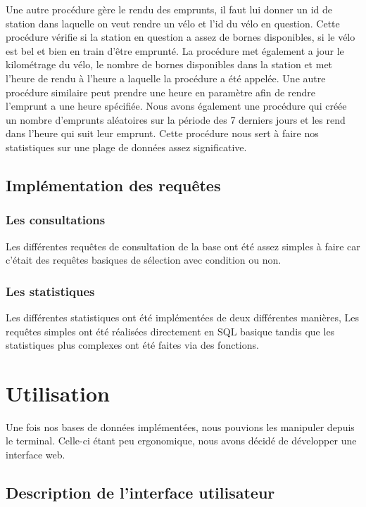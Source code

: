 \documentclass[10pt]{article}
\begin{document}
  Une autre procédure gère le rendu des emprunts, il faut lui donner un id de station dans laquelle on veut rendre un vélo et l'id du vélo en question. Cette procédure vérifie si la station en question a assez de bornes disponibles, si le vélo est bel et bien en train d'être emprunté. La procédure met également a jour le kilométrage du vélo, le nombre de bornes disponibles dans la station et met l'heure de rendu à l'heure a laquelle la procédure a été appelée. Une autre procédure similaire peut prendre une heure en paramètre afin de rendre l'emprunt a une heure spécifiée. 
  Nous avons également une procédure qui créée un nombre d'emprunts aléatoires sur la période des 7 derniers jours et les rend dans l'heure qui suit leur emprunt. Cette procédure nous sert à faire nos statistiques sur une plage de données assez significative.
  
  \subsection{Implémentation des requêtes}\label{subsec:requete}
  \subsubsection{Les consultations}
  Les différentes requêtes de consultation de la base ont été assez simples à faire car c'était des requêtes basiques de sélection avec condition ou non.
  \subsubsection{Les statistiques}
  Les différentes statistiques ont été implémentées de deux différentes manières, Les requêtes simples ont été réalisées directement en SQL basique tandis que les statistiques plus complexes ont été faites via des fonctions.
  
  \section{Utilisation}\label{sec:utili}
  
  Une fois nos bases de données implémentées, nous pouvions les manipuler depuis le terminal. Celle-ci étant peu ergonomique, nous avons décidé de développer une interface web.
  
  \subsection{Description de l'interface utilisateur}\label{subsec:desc}
  
\end{document}
